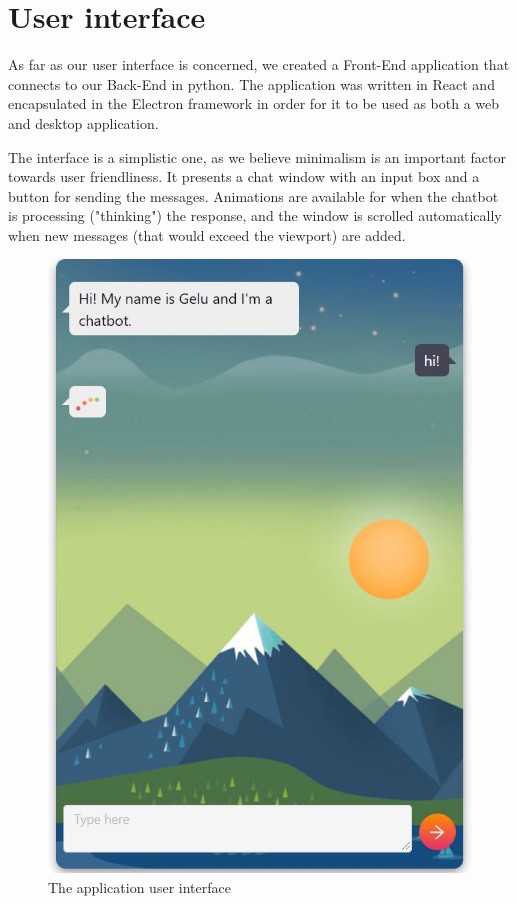 \documentclass[runningheads,a4paper,11pt]{report}
\begin{document}
\section{User interface}
\label{section:UI}

As far as our user interface is concerned, we created a Front-End application that connects to our Back-End in python. The application was written in React and encapsulated in the Electron framework in order for it to be used as both a web and desktop application. 

The interface is a simplistic one, as we believe minimalism is an important factor towards user friendliness. It presents a chat window with an input box and a button for sending the messages. Animations are available for when the chatbot is processing ("thinking") the response, and the window is scrolled automatically when new messages (that would exceed the viewport) are added.

\begin{figure}[ht!]
\centerline{\includegraphics[width=12cm]{Img/uiscreen.JPG}}  
	\caption{The application user interface}
	\label{uiscreen}
\end{figure}
\end{document}
